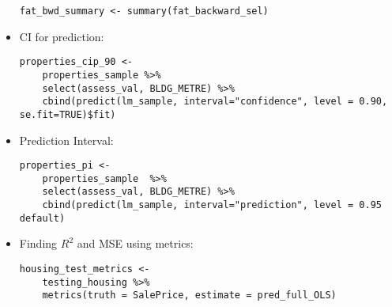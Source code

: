 \documentclass[8pt,landscape,a4paper, fleqn, dvipsnames]{extarticle}
\begin{document}
\begin{multicols*}{4}
\begin{itemize}
\begin{lstlisting}
fat_bwd_summary <- summary(fat_backward_sel)
    \end{lstlisting}
    \item CI for prediction:
    \begin{lstlisting}
properties_cip_90 <- 
    properties_sample %>% 
    select(assess_val, BLDG_METRE) %>% 
    cbind(predict(lm_sample, interval="confidence", level = 0.90, se.fit=TRUE)$fit)
    \end{lstlisting}
    \item Prediction Interval:
    \begin{lstlisting}
properties_pi <- 
    properties_sample  %>% 
    select(assess_val, BLDG_METRE) %>% 
    cbind(predict(lm_sample, interval="prediction", level = 0.95 default)
    \end{lstlisting}
    \item Finding $R^2$ and MSE using metrics:
    \begin{lstlisting}
housing_test_metrics <- 
    testing_housing %>%
    metrics(truth = SalePrice, estimate = pred_full_OLS)


\end{lstlisting}
\end{itemize}
\end{multicols*}
\end{document}
